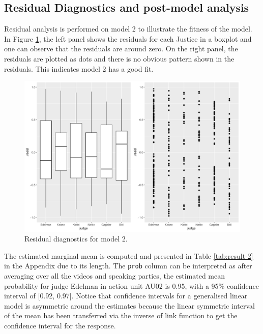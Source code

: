 \documentclass{monashthesis}
\begin{document}
\hypertarget{residual-diagnostics-and-post-model-analysis}{%
\subsection{Residual Diagnostics and post-model analysis}\label{residual-diagnostics-and-post-model-analysis}}

Residual analysis is performed on model 2 to illustrate the fitness of the model. In Figure \ref{fig:resid}, the left panel shows the residuals for each Justice in a boxplot and one can observe that the residuals are around zero. On the right panel, the residuals are plotted as dots and there is no obvious pattern shown in the residuals. This indicates model 2 has a good fit.

\begin{figure}

{\centering \includegraphics[width=1\linewidth]{figures/resid-1} 

}

\caption{Residual diagnostics for model 2. }\label{fig:resid}
\end{figure}

The estimated marginal mean is computed and presented in Table \ref{tab:result-2} in the Appendix due to its length. The \texttt{prob} column can be interpreted as after averaging over all the videos and speaking parties, the estimated mean probability for judge Edelman in action unit AU02 is 0.95, with a 95\% confidence interval of {[}0.92, 0.97{]}. Notice that confidence intervals for a generalised linear model is asymmetric around the estimates because the linear symmetric interval of the mean has been transferred via the inverse of link function to get the confidence interval for the response.
\end{document}
